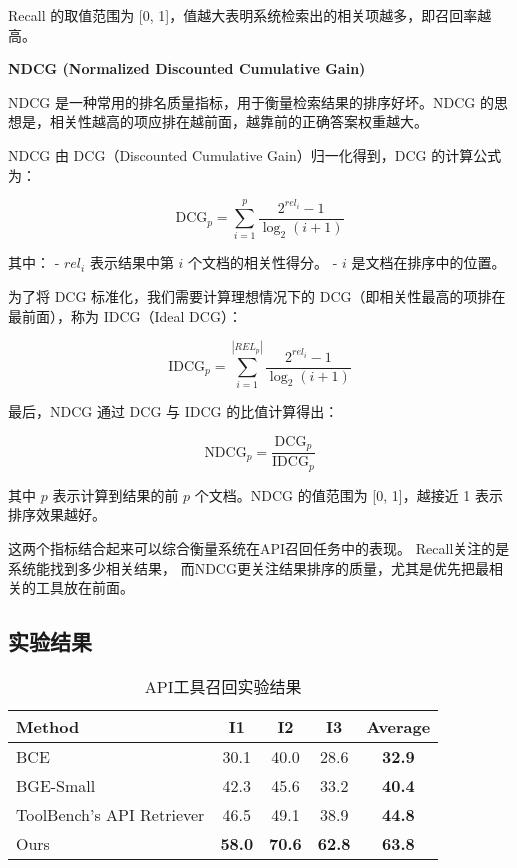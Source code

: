Recall 的取值范围为 [0, 1]，值越大表明系统检索出的相关项越多，即召回率越高。

\textbf{NDCG (Normalized Discounted Cumulative Gain)}

NDCG 是一种常用的排名质量指标，用于衡量检索结果的排序好坏。NDCG 的思想是，相关性越高的项应排在越前面，越靠前的正确答案权重越大。

NDCG 由 DCG（Discounted Cumulative Gain）归一化得到，DCG 的计算公式为：

\[
\text{DCG}_p = \sum_{i=1}^{p} \frac{2^{rel_i} - 1}{\log_2(i + 1)}
\]

其中：
- \(rel_i\) 表示结果中第 \(i\) 个文档的相关性得分。
- \(i\) 是文档在排序中的位置。

为了将 DCG 标准化，我们需要计算理想情况下的 DCG（即相关性最高的项排在最前面），称为 IDCG（Ideal DCG）：

\[
\text{IDCG}_p = \sum_{i=1}^{|REL_p|} \frac{2^{rel_i} - 1}{\log_2(i + 1)}
\]

最后，NDCG 通过 DCG 与 IDCG 的比值计算得出：

\[
\text{NDCG}_p = \frac{\text{DCG}_p}{\text{IDCG}_p}
\]

其中 \(p\) 表示计算到结果的前 \(p\) 个文档。NDCG 的值范围为 [0, 1]，越接近 1 表示排序效果越好。

这两个指标结合起来可以综合衡量系统在API召回任务中的表现。
Recall关注的是系统能找到多少相关结果，
而NDCG更关注结果排序的质量，尤其是优先把最相关的工具放在前面。

\subsection{实验结果}

\begin{table}[!ht]
  \centering
  \caption{API工具召回实验结果}
  \label{tab:comparison}
  \begin{tabular}{lccc>{\bfseries}c} %
    \toprule
    \textbf{Method} & \textbf{I1} & \textbf{I2} & \textbf{I3} & \textbf{Average} \\ \midrule
    BCE         & 30.1 & 40.0 & 28.6 & 32.9 \\
    BGE-Small         & 42.3 & 45.6 & 33.2 & 40.4 \\
    ToolBench's API Retriever   & 46.5 & 49.1 & 38.9 & 44.8 \\
    Ours        & \textbf{58.0} & \textbf{70.6} & \textbf{62.8} & \textbf{63.8} \\ \bottomrule
  \end{tabular}
\end{table}

